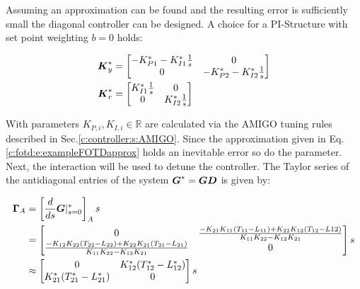 Assuming an approximation can be found and the resulting error is sufficiently small the diagonal controller can be designed. A choice for a PI-Structure with set point weighting $b=0$ holds:

\begin{align}
\begin{split}
\mbox{\boldmath$K$}_y^* &= \begin{bmatrix}
-K_{P1}^* - K_{I1}^*\frac{1}{s} & 0 \\
0 & -K_{P2}^* - K_{I2}^*\frac{1}{s}
\end{bmatrix} \\
\mbox{\boldmath$K$}_r^* &= \begin{bmatrix}
K_{I1}^*\frac{1}{s} & 0 \\
0 & K_{I2}^*\frac{1}{s}
\end{bmatrix} 
\end{split}
\label{c:fotd:e:exampleTransformedControler}
\end{align}

%  

With parameters $K_{P,i},K_{I,i} \in \mathbb{R}$ are calculated via the AMIGO tuning rules described in Sec.\ref{c:controller:s:AMIGO}. Since the approximation given in Eq.\ref{c:fotd:e:exampleFOTDapprox} holds an inevitable error so do the parameter. \\

Next, the interaction will be used to detune the controller. The Taylor series of the antidiagonal entries of the system $\mbox{\boldmath$G$}^* = \mbox{\boldmath$G$} \mbox{\boldmath$D$}$ is given by:

\begin{align}
\begin{split}
\mbox{\boldmath$\Gamma$}_A &= \left[\frac{d}{ds}\mbox{\boldmath$G$}|^*_{s=0}\right]_A s \\
&= \begin{bmatrix}
0 & \frac{-K_{21}K_{11}(T_{11}-L_{11}) + K_{22}K_{12}(T_{12}-L{12})}{K_{11}K_{22}-K_{12}K_{21}} \\
\frac{-K_{12}K_{22}(T_{22}-L_{22}) + K_{22}K_{21}(T_{21}-L_{21})}{K_{11}K_{22}-K_{12}K_{21}} & 0
\end{bmatrix} s\\
&\approx \begin{bmatrix}
0 & K_{12}^* (T_{12}^* - L_{12}^*) \\
K_{21}^* (T_{21}^* - L_{21}^*) & 0 
\end{bmatrix} s
\end{split}
\label{c:fotd:e:exampleTransformedCoupling}
\end{align}

